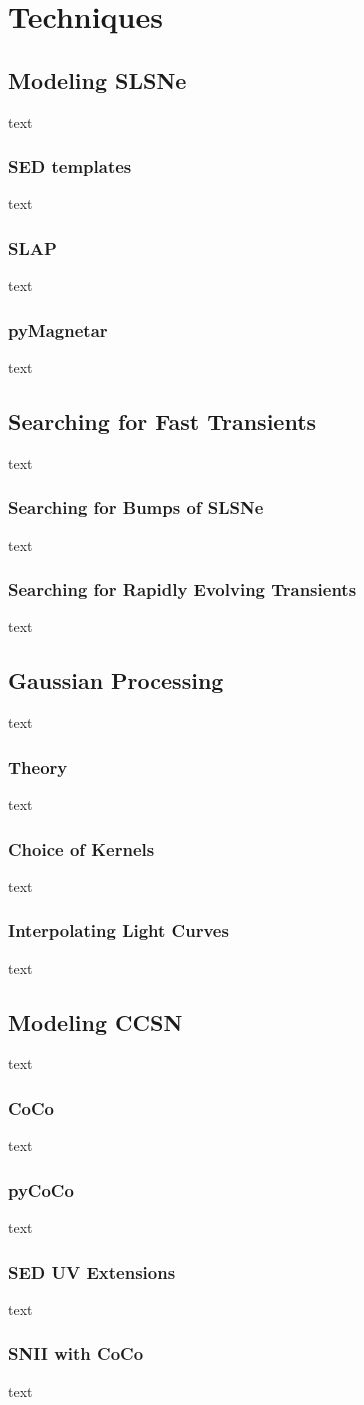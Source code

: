 
\chapter{Techniques} %
\label{Chapter4}

\section{Modeling SLSNe}
text
\subsection{SED templates}
text
\subsection{SLAP}
text
\subsection{pyMagnetar}
text

\section{Searching for Fast Transients}
text
\subsection{Searching for Bumps of SLSNe}
text
\subsection{Searching for Rapidly Evolving Transients}
text

\section{Gaussian Processing}
text
\subsection{Theory}
text
\subsection{Choice of Kernels}
text
\subsection{Interpolating Light Curves}
text

\section{Modeling CCSN}
text
\subsection{CoCo}
text
\subsection{pyCoCo}
text
\subsection{SED UV Extensions}
text
\subsection{SNII with CoCo}
text
